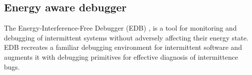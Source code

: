 \subsection{Energy aware debugger}
The Energy-Interference-Free Debugger (EDB) \cite{edb}, is a tool for monitoring and debugging of intermittent systems without adversely affecting their energy state. EDB recreates a familiar debugging environment for intermittent software and augments it with debugging primitives for effective diagnosis of intermittence bugs.



